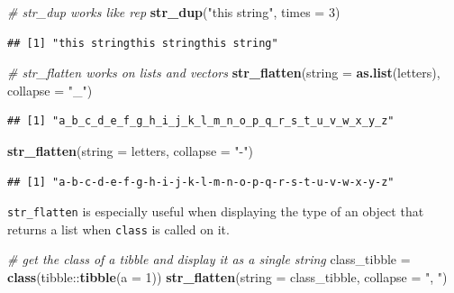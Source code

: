\documentclass[]{book}
\newenvironment{Shaded}{}{}
\newcommand{\CommentTok}[1]{\textcolor[rgb]{0.38,0.63,0.69}{\textit{#1}}}
\newcommand{\DataTypeTok}[1]{\textcolor[rgb]{0.56,0.13,0.00}{#1}}
\newcommand{\DecValTok}[1]{\textcolor[rgb]{0.25,0.63,0.44}{#1}}
\newcommand{\KeywordTok}[1]{\textcolor[rgb]{0.00,0.44,0.13}{\textbf{#1}}}
\newcommand{\NormalTok}[1]{#1}
\newcommand{\OperatorTok}[1]{\textcolor[rgb]{0.40,0.40,0.40}{#1}}
\newcommand{\StringTok}[1]{\textcolor[rgb]{0.25,0.44,0.63}{#1}}
\begin{document}
\begin{Shaded}
\begin{Highlighting}[]
\CommentTok{# str_dup works like rep}
\KeywordTok{str_dup}\NormalTok{(}\StringTok{"this string"}\NormalTok{, }\DataTypeTok{times =} \DecValTok{3}\NormalTok{)}
\end{Highlighting}
\end{Shaded}

\begin{verbatim}
## [1] "this stringthis stringthis string"
\end{verbatim}

\begin{Shaded}
\begin{Highlighting}[]
\CommentTok{# str_flatten works on lists and vectors}
\KeywordTok{str_flatten}\NormalTok{(}\DataTypeTok{string =} \KeywordTok{as.list}\NormalTok{(letters), }\DataTypeTok{collapse =} \StringTok{"_"}\NormalTok{)}
\end{Highlighting}
\end{Shaded}

\begin{verbatim}
## [1] "a_b_c_d_e_f_g_h_i_j_k_l_m_n_o_p_q_r_s_t_u_v_w_x_y_z"
\end{verbatim}

\begin{Shaded}
\begin{Highlighting}[]
\KeywordTok{str_flatten}\NormalTok{(}\DataTypeTok{string =}\NormalTok{ letters, }\DataTypeTok{collapse =} \StringTok{"-"}\NormalTok{)}
\end{Highlighting}
\end{Shaded}

\begin{verbatim}
## [1] "a-b-c-d-e-f-g-h-i-j-k-l-m-n-o-p-q-r-s-t-u-v-w-x-y-z"
\end{verbatim}

\texttt{str\_flatten} is especially useful when displaying the type of an object that returns a list when \texttt{class} is called on it.

\begin{Shaded}
\begin{Highlighting}[]
\CommentTok{# get the class of a tibble and display it as a single string}
\NormalTok{class_tibble =}\StringTok{ }\KeywordTok{class}\NormalTok{(tibble}\OperatorTok{::}\KeywordTok{tibble}\NormalTok{(}\DataTypeTok{a =} \DecValTok{1}\NormalTok{))}
\KeywordTok{str_flatten}\NormalTok{(}\DataTypeTok{string =}\NormalTok{ class_tibble, }\DataTypeTok{collapse =} \StringTok{", "}\NormalTok{)}
\end{Highlighting}
\end{Shaded}
\end{document}
